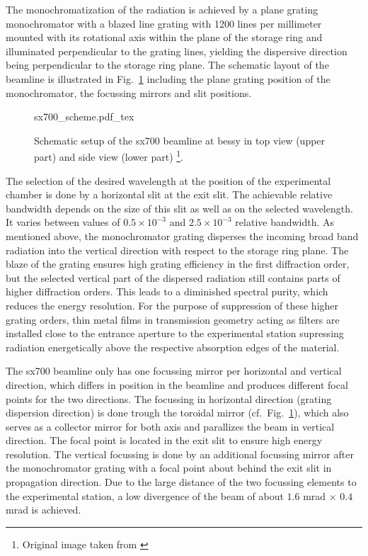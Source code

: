 The monochromatization of the radiation is achieved by a plane grating monochromator with a blazed line grating with 1200 lines per millimeter mounted with its rotational axis within the plane of the storage ring and illuminated perpendicular to the grating lines, yielding the dispersive direction being perpendicular to the storage ring plane. The schematic layout of the beamline is illustrated in Fig.~\ref{ch_exp:fig_sx700_schematic} including the plane grating position of the monochromator, the focussing mirrors and slit positions.
\begin{figure}[htb]
    \def\svgwidth{\textwidth}
    {sx700_scheme.pdf_tex}
    \caption[Schematic setup of the SX700 beamline.]{Schematic setup of the \gls{sx700} beamline at \gls{bessy} in top view (upper part) and side view (lower part) \footnote{Original image taken from \textcite{scholze_high-accuracy_2001}}.}
    \label{ch_exp:fig_sx700_schematic}
\end{figure}
The selection of the desired wavelength at the position of the experimental chamber is done by a horizontal slit at the exit slit. The achievable relative bandwidth depends on the size of this slit as well as on the selected wavelength. It varies between values of $0.5\times 10^{-3}$ and $2.5\times 10^{-3}$ relative bandwidth. As mentioned above, the monochromator grating disperses the incoming broad band radiation into the vertical direction with respect to the storage ring plane. The blaze of the grating ensures high grating efficiency in the first diffraction order, but the selected vertical part of the dispersed radiation still contains parts of higher diffraction orders. This leads to a diminished spectral purity, which reduces the energy resolution. For the purpose of suppression of these higher grating orders, thin metal films in transmission geometry acting as filters are installed close to the entrance aperture to the experimental station supressing radiation energetically above the respective absorption edges of the material.

The \gls{sx700} beamline only has one focussing mirror per horizontal and vertical direction, which differs in position in the beamline and produces different focal points for the two directions. The focussing in horizontal direction (grating dispersion direction) is done trough the toroidal mirror (cf.~Fig.~\ref{ch_exp:fig_sx700_schematic}), which also serves as a collector mirror for both axis and parallizes the beam in vertical direction. The focal point is located in the exit slit to ensure high energy resolution. The vertical focussing is done by an additional focussing mirror after the monochromator grating with a focal point about  behind the exit slit in propagation direction. Due to the large distance of the two focussing elements to the experimental station, a low divergence of the beam of about $1.6$ mrad $\times$ $0.4$ mrad is achieved.

